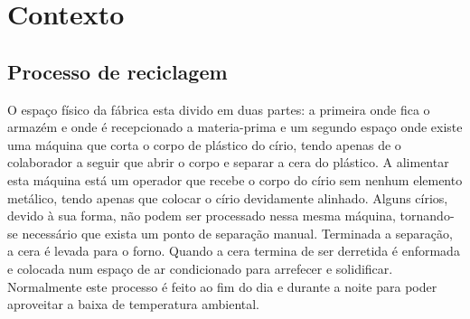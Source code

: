 \chapter{Contexto} 
\label{cap:2}
\section{Processo de reciclagem}
O espaço físico da fábrica esta divido em duas partes: a primeira onde fica o armazém e onde é recepcionado a materia-prima e um segundo espaço onde existe uma máquina que corta o corpo de plástico do círio, tendo apenas de o colaborador a seguir que abrir o corpo e separar a cera do plástico. A alimentar esta máquina está um operador que recebe o corpo do círio sem nenhum elemento metálico, tendo apenas que colocar o círio devidamente alinhado. Alguns círios, devido à sua forma, não podem ser processado nessa mesma máquina, tornando-se necessário que exista um ponto de separação manual. Terminada a separação, a cera é levada para o forno. Quando a cera termina de ser derretida é enformada e colocada num espaço de ar condicionado para arrefecer e solidificar. Normalmente este processo é feito ao fim do dia e durante a noite para poder aproveitar a baixa de temperatura ambiental.


